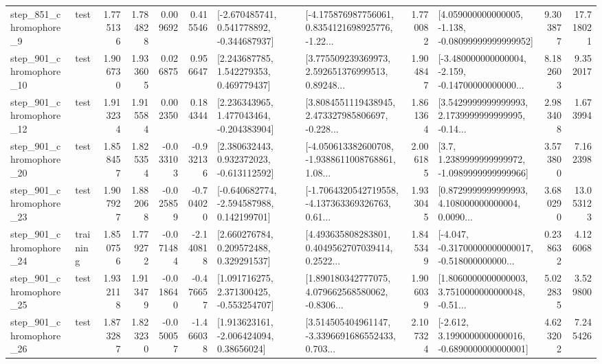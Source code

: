 \begin{tabular}{llrrrrllrlrr}
   step\_851\_chromophore\_9 &      test &      1.775136 &    1.784828 &      0.009692 &  0.415546 &   [-2.670485741, 0.541778892, -0.344687937] &  [-4.175876987756061, 0.8354121698925776, -1.22... &       1.770082 &  [4.059000000000005, -1.138, -0.08099999999999952] &            9.303877 &         17.718021 \\
  step\_901\_chromophore\_10 &      test &      1.906730 &    1.933605 &      0.026875 &  0.956647 &     [2.243687785, 1.542279353, 0.469779437] &  [3.775509239369973, 2.592651376999513, 0.89248... &       1.904847 &  [-3.480000000000004, -2.159, -0.14700000000000... &            8.182603 &          9.352017 \\
  step\_901\_chromophore\_12 &      test &      1.913234 &    1.915584 &      0.002350 &  0.184344 &    [2.236343965, 1.477043464, -0.204383904] &  [3.8084551119438945, 2.473327985806697, -0.228... &       1.861364 &  [3.5429999999999993, 2.1739999999999995, -0.14... &            2.983408 &          1.673994 \\
  step\_901\_chromophore\_20 &      test &      1.858457 &    1.825354 &     -0.033103 & -0.932136 &    [2.380632443, 0.932372023, -0.613112592] &  [-4.050613382600708, -1.9388611008768861, 1.08... &       2.006185 &     [3.7, 1.2389999999999972, -1.0989999999999966] &            3.573800 &          7.162398 \\
  step\_901\_chromophore\_23 &      test &      1.907927 &    1.882068 &     -0.025859 & -0.704020 &   [-0.640682774, -2.594587988, 0.142199701] &  [-1.7064320542719558, -4.137363369326763, 0.61... &       1.933045 &  [0.8729999999999993, 4.108000000000004, 0.0090... &            3.680290 &         13.053123 \\
  step\_901\_chromophore\_24 &  training &      1.850756 &    1.779272 &     -0.071484 & -2.140818 &     [2.660276784, 0.209572488, 0.329291537] &  [4.493635808283801, 0.4049562707039414, 0.2522... &       1.845349 &  [-4.047, -0.31700000000000017, -0.518000000000... &            0.238632 &          4.126068 \\
  step\_901\_chromophore\_25 &      test &      1.932118 &    1.913479 &     -0.018640 & -0.476657 &    [1.091716275, 2.371300425, -0.553254707] &  [1.890180342777075, 4.079662568580062, -0.8306... &       1.906039 &  [1.8060000000000003, 3.7510000000000048, -0.51... &            5.022835 &          3.529800 \\
  step\_901\_chromophore\_26 &      test &      1.873287 &    1.823230 &     -0.050057 & -1.466038 &     [1.913623161, -2.006424094, 0.38656024] &  [3.514505404961147, -3.3396691686552433, 0.703... &       2.107324 &  [-2.612, 3.1990000000000016, -0.6890000000000001] &            4.623202 &          7.245426 \\

\end{tabular}
